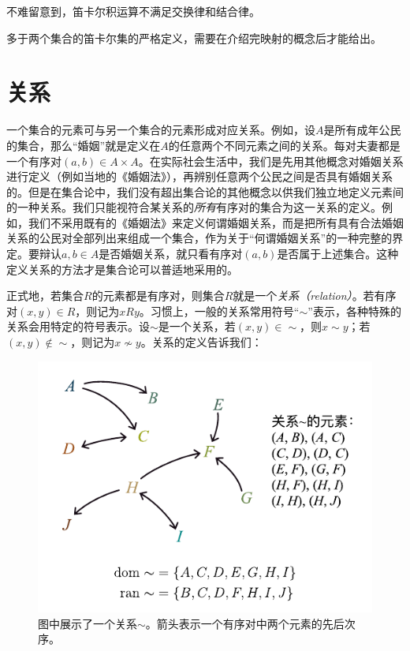 \documentclass[../main.tex]{subfiles}
\begin{document}
不难留意到，笛卡尔积运算不满足交换律和结合律。

多于两个集合的笛卡尔集的严格定义，需要在介绍完映射的概念后才能给出。

\section{关系}
一个集合的元素可与另一个集合的元素形成对应关系。例如，设$A$是所有成年公民的集合，那么“婚姻”就是定义在$A$的任意两个不同元素之间的关系。每对夫妻都是一个有序对$\left(a,b\right)\in A\times A$。在实际社会生活中，我们是先用其他概念对婚姻关系进行定义（例如当地的《婚姻法》），再辨别任意两个公民之间是否具有婚姻关系的。但是在集合论中，我们没有超出集合论的其他概念以供我们独立地定义元素间的一种关系。我们只能视符合某关系的\emph{所有}有序对的集合为这一关系的定义。例如，我们不采用既有的《婚姻法》来定义何谓婚姻关系，而是把所有具有合法婚姻关系的公民对全部列出来组成一个集合，作为关于“何谓婚姻关系”的一种完整的界定。要辩认$a, b\in A$是否婚姻关系，就只看有序对$\left(a,b\right)$是否属于上述集合。这种定义关系的方法才是集合论可以普适地采用的。

正式地，若集合$R$的元素都是有序对，则集合$R$就是一个\emph{关系（relation）}。若有序对$\left(x,y\right)\in R$，则记为$xRy$。习惯上，一般的关系常用符号“$\sim$”表示，各种特殊的关系会用特定的符号表示。设$\sim$是一个关系，若$\left(x,y\right)\in \sim$，则$x\sim y$；若$\left(x,y\right)\notin\sim$，则记为$x\not\sim y$。关系的定义告诉我们：

\begin{figure}[htbp]
    \centering
    \includegraphics{../images/relation.pdf}
    \caption{图中展示了一个关系$\sim$。箭头表示一个有序对中两个元素的先后次序。}
    \label{fig:II.1.1}
\end{figure}
\end{document}
